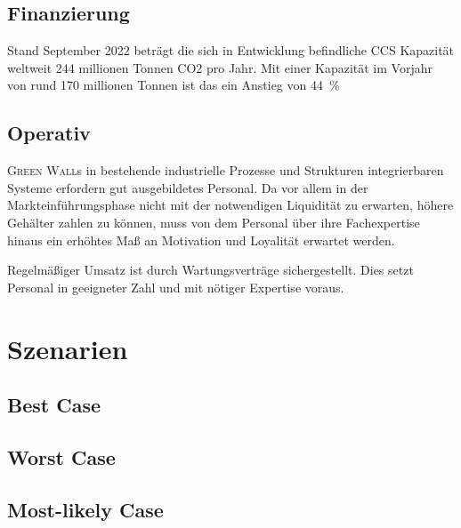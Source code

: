         \subsection{Finanzierung}

            Stand September 2022 beträgt die sich in Entwicklung befindliche CCS Kapazität weltweit 244 millionen Tonnen CO2 pro Jahr.
            Mit einer Kapazität im Vorjahr von rund 170 millionen Tonnen ist das ein Anstieg von \qty{44}{\percent}
            

        \subsection{Operativ}
            \textsc{Green Wall}s in bestehende industrielle Prozesse und Strukturen integrierbaren Systeme erfordern gut ausgebildetes Personal.
            Da vor allem in der Markteinführungsphase nicht mit der notwendigen Liquidität zu erwarten, höhere Gehälter zahlen zu können, muss von dem Personal über ihre Fachexpertise hinaus ein erhöhtes Maß an Motivation und Loyalität erwartet werden.\par\medskip

            Regelmäßiger Umsatz ist durch Wartungsverträge sichergestellt.
            Dies setzt Personal in geeigneter Zahl und mit nötiger Expertise voraus.
    
    \section{Szenarien}

        \subsection{Best Case}

        \subsection{Worst Case}

        \subsection{Most-likely Case}

